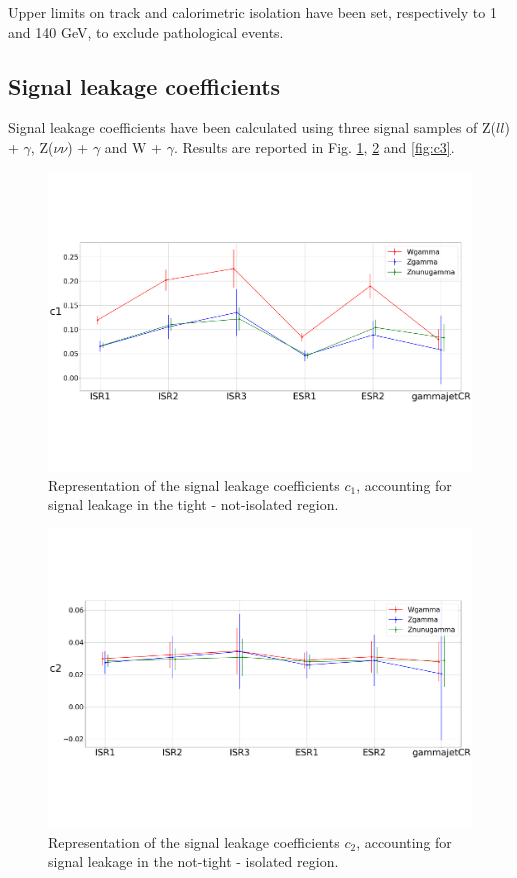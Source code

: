 \documentclass[11pt,a4paper,twoside,openright]{book}
\begin{document}
Upper limits on track and calorimetric isolation have been set, respectively to 1 and 140 GeV, to exclude pathological events.

\subsection{Signal leakage coefficients}

Signal leakage coefficients have been calculated using three signal samples of Z($ll$) + $\gamma$, Z($\nu \nu$) + $\gamma$ and W + $\gamma$. Results are reported in Fig. \ref{fig:c1}, \ref{fig:c2} and \ref{fig:c3}.


\begin{figure}[hbtp!]
    \centering
    \includegraphics[width=12cm]{c1.pdf}
    \caption{Representation of the signal leakage coefficients $c_{1}$, accounting for signal leakage in the tight - not-isolated region.}
    \label{fig:c1}
\end{figure}


\begin{figure}[hbtp!]
    \centering
    \includegraphics[width=12cm]{c2.pdf}
    \caption{Representation of the signal leakage coefficients $c_{2}$, accounting for signal leakage in the not-tight - isolated region.}
    \label{fig:c2}
\end{figure}
\end{document}
